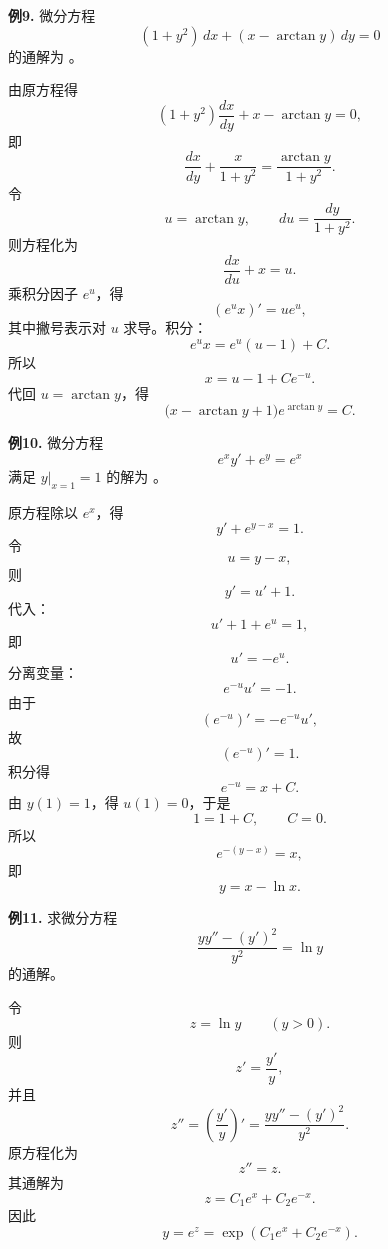 \begin{problemblock}
\textbf{例9.} 微分方程
\[
(1+y^2)\,dx+(x-\arctan y)\,dy=0
\]
的通解为 \underline{\hspace{5cm}}。
\end{problemblock}
\begin{solutionblock}
由原方程得
\[
(1+y^2)\frac{dx}{dy}+x-\arctan y=0,
\]
即
\[
\frac{dx}{dy}+\frac{x}{1+y^2}
=\frac{\arctan y}{1+y^2}.
\]
令
\[
u=\arctan y,\qquad du=\frac{dy}{1+y^2}.
\]
则方程化为
\[
\frac{dx}{du}+x=u.
\]
乘积分因子 \(e^u\)，得
\[
(e^ux)'=ue^u,
\]
其中撇号表示对 \(u\) 求导。积分：
\[
e^ux=e^u(u-1)+C.
\]
所以
\[
x=u-1+Ce^{-u}.
\]
代回 \(u=\arctan y\)，得
\[
\bigl(x-\arctan y+1\bigr)e^{\arctan y}=C.
\]
\end{solutionblock}

\begin{problemblock}
\textbf{例10.} 微分方程
\[
e^x y'+e^y=e^x
\]
满足 \(\left.y\right|_{x=1}=1\) 的解为 \underline{\hspace{5cm}}。
\end{problemblock}
\begin{solutionblock}
原方程除以 \(e^x\)，得
\[
y'+e^{y-x}=1.
\]
令
\[
u=y-x,
\]
则
\[
y'=u'+1.
\]
代入：
\[
u'+1+e^u=1,
\]
即
\[
u'=-e^u.
\]
分离变量：
\[
e^{-u}u'=-1.
\]
由于
\[
(e^{-u})'=-e^{-u}u',
\]
故
\[
(e^{-u})'=1.
\]
积分得
\[
e^{-u}=x+C.
\]
由 \(y(1)=1\)，得 \(u(1)=0\)，于是
\[
1=1+C,\qquad C=0.
\]
所以
\[
e^{-(y-x)}=x,
\]
即
\[
y=x-\ln x.
\]
\end{solutionblock}

\begin{problemblock}
\textbf{例11.} 求微分方程
\[
\frac{yy''-(y')^2}{y^2}=\ln y
\]
的通解。
\end{problemblock}
\begin{solutionblock}
令
\[
z=\ln y\qquad (y>0).
\]
则
\[
z'=\frac{y'}y,
\]
并且
\[
z''=\left(\frac{y'}y\right)'
=\frac{yy''-(y')^2}{y^2}.
\]
原方程化为
\[
z''=z.
\]
其通解为
\[
z=C_1e^x+C_2e^{-x}.
\]
因此
\[
y=e^z=\exp\left(C_1e^x+C_2e^{-x}\right).
\]
\end{solutionblock}

